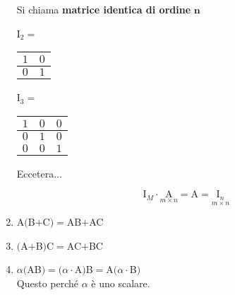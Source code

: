 \begin{enumerate}
        Si chiama \textbf{matrice identica di ordine }$\pmb{n}$
        \begin{center}
            I$_2=$
            \begin{tabular}{|c|c|}
                \hline
                $1$ & $0$ \\
                \hline
                $0$ & $1$\\
                \hline
            \end{tabular} \hspace{1cm}
            I$_3=$
            \begin{tabular}{|c|c|c|}
                \hline
                $1$ & $0$ & $0$\\
                \hline
                $0$ & $1$ & $0$\\
                \hline
                $0$ & $0$ & $1$\\
                \hline
            \end{tabular} \hspace{1cm}
            Eccetera...
        \end{center}
        $$\textrm{I}_M\cdot\underset{m\times  n}{\textrm{A}} = \textrm{A} = \underset{m\times n}{\textrm{I}_n}$$
    \item A$($B$+$C$)=$AB$+$AC
    \item $($A$+$B$)$C$=$AC$+$BC
    \item $\alpha($AB$)=(\alpha\cdot$A$)$B$=${\color{red}A$(\alpha\cdot$B$)$}\\
        Questo perché $\alpha$ è uno scalare.
\end{enumerate}

